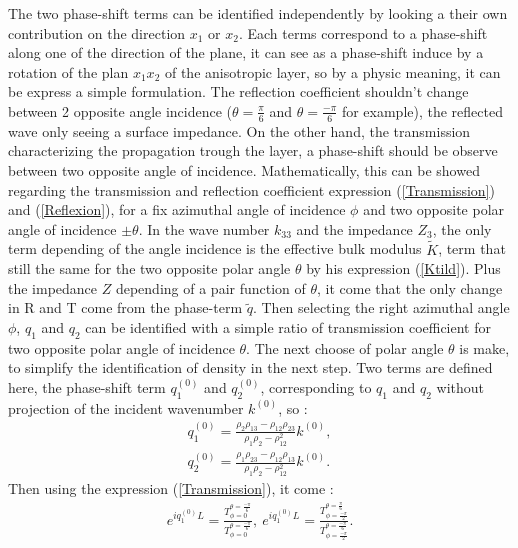 \documentclass{article}
\begin{document}
    The two phase-shift terms can be identified independently by looking a their own contribution on the direction $x_1$ or $x_2$. Each terms correspond to a phase-shift along one of the direction of the plane, it can see as a phase-shift induce by a rotation of the plan $x_1x_2$ of the anisotropic layer, so by a physic meaning, it can be express a simple formulation. The reflection coefficient shouldn't change between 2 opposite angle incidence ($\theta=\frac{\pi}{6}$ and $\theta=\frac{-\pi}{6}$ for example), the reflected wave only seeing a surface impedance. On the other hand, the transmission characterizing the propagation trough the layer, a phase-shift should be observe between two opposite angle of incidence. Mathematically, this can be showed regarding the transmission and reflection coefficient expression (\ref{Transmission}) and (\ref{Reflexion}), for a fix azimuthal angle of incidence $\phi$ and two opposite polar angle of incidence $\pm \theta$. In the wave number $k_{33}$ and the impedance $Z_3$, the only term depending of the angle incidence is the effective bulk modulus $\tilde{K}$, term that still the same for the two opposite polar angle $\theta$ by his expression (\ref{Ktild}). Plus the impedance $Z$ depending of a pair  function of $\theta$, it come that the only change in R and T come from the phase-term $\tilde{q}$. Then selecting the right azimuthal angle $\phi$, $q_1$ and $q_2$ can be identified with a simple ratio of transmission coefficient for two opposite polar angle of incidence $\theta$. The next choose of polar angle $\theta$ is make, to simplify the identification of density in the next step. Two terms are defined here, the phase-shift term $q_1^{(0)}$ and $q_2^{(0)}$, corresponding to $q_1$ and $q_2$ without projection of the incident wavenumber $k^{(0)}$, so :
    \begin{align}
        q_1^{(0)}=\frac{\rho_2\rho_{13}-\rho_{12}\rho_{23}}{\rho_1\rho_2-\rho_{12}^2}k^{(0)},\\
        q_2^{(0)}=\frac{\rho_1\rho_{23}-\rho_{12}\rho_{13}}{\rho_1\rho_2-\rho_{12}^2}k^{(0)}.
    \end{align}
    Then using the expression (\ref{Transmission}), it come :
    \begin{align}
     e^{iq_1^{(0)}L}=\frac{T^{\theta=\frac{-\pi}{6}}_{\phi=0}}{T^{\theta=\frac{-\pi}{6}}_{\phi=0}},\ e^{iq_1^{(0)}L}=\frac{T^{\theta=\frac{\pi}{6}}_{\phi=\frac{-\pi}{2}}}{T^{\theta=\frac{-\pi}{6}}_{\phi=\frac{-\pi}{2}}}.
    \end{align}
    
\end{document}
